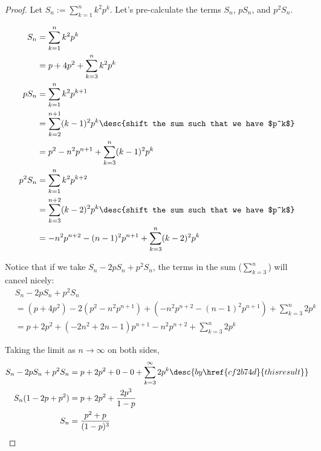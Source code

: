 \begin{proof}
  Let $S_n:=\sum_{k=1}^nk^2p^k$. Let's pre-calculate the terms $S_n$, $pS_n$,
  and $p^2S_n$.

  \begin{align*}
    S_n    &=\sum_{k=1}^nk^2p^k                                                     \\
           &=p+4p^2+\sum_{k=3}^nk^2p^k                                              \\
    pS_n   &=\sum_{k=1}^nk^2p^{k+1}                                                 \\
           &=\sum_{k=2}^{n+1}(k-1)^2p^k\desc{shift the sum such that we have $p^k$} \\
           &=p^2-n^2p^{n+1}+\sum_{k=3}^n(k-1)^2p^k                                  \\
    p^2S_n &=\sum_{k=1}^nk^2p^{k+2}                                                 \\
           &=\sum_{k=3}^{n+2}(k-2)^2p^k\desc{shift the sum such that we have $p^k$} \\
           &=-n^2p^{n+2}-(n-1)^2p^{n+1}+\sum_{k=3}^n(k-2)^2p^k
  \end{align*}

  Notice that if we take $S_n-2pS_n+p^2S_n$, the terms in the sum
  ($\sum_{k=3}^n$) will cancel nicely:
  \begin{align*}
     &S_n-2pS_n+p^2S_n                                                          \\
     &=(p+4p^2)-2(p^2-n^2p^{n+1})+(-n^2p^{n+2}-(n-1)^2p^{n+1})+\sum_{k=3}^n2p^k \\
     &=p+2p^2+(-2n^2+2n-1)p^{n+1}-n^2p^{n+2}+\sum_{k=3}^n2p^k
  \end{align*}

  Taking the limit as $n\to\infty$ on both sides,
  \begin{align*}
    S_n-2pS_n+p^2S_n &=p+2p^2+0-0+\sum_{k=3}^\infty2p^k\desc{by \href{cf2b74d}{this result}} \\
    S_n(1-2p+p^2)    &=p+2p^2+\frac{2p^3}{1-p}                                               \\
    S_n              &=\frac{p^2+p}{(1-p)^3}
  \end{align*}
\end{proof}
